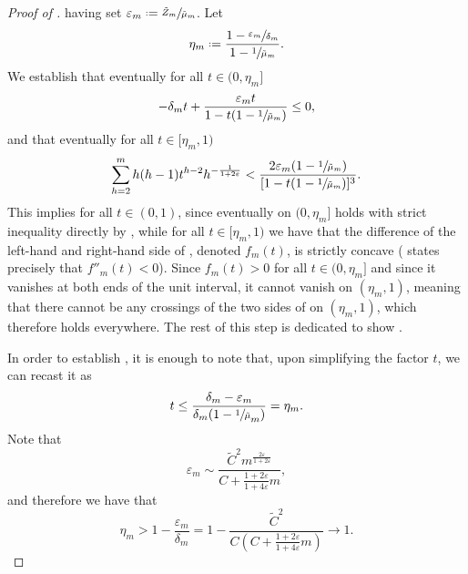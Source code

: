 \documentclass[11pt, a4paper, twoside]{article}
\newcommand*{\defeq}{\mathrel{\vcenter{\baselineskip0.5ex \lineskiplimit0pt
			\hbox{\scriptsize.}\hbox{\scriptsize.}}}=}
\newcommand{\eps}{\varepsilon}
\numberwithin{equation}{section}
\begin{document}
\begin{proof}[Proof of ]
		having set $\eps_m\defeq \sfrac{\tilde{Z}_m}{\tilde{\mu}_m}$. Let 
		\begin{align*}\label{eta}
			\eta_m\defeq \frac{1-\sfrac{\eps_m}{\delta_m}}{1-\sfrac{1}{\tilde{\mu}_m}}.
		\end{align*}
		We establish that eventually for all $t\in(0,\eta_m]$
		\begin{equation}\label{linear1}
			-\delta_mt+\frac{\eps_mt}{1-t(1-\sfrac{1}{\tilde{\mu}_m})}\le0,
		\end{equation}
		and that eventually for all $t\in[\eta_m,1)$
		\begin{equation}\label{concave1}
			\sum_{h=2}^m h(h-1)t^{h-2} h^{-\frac{1}{1+2\eps}}<\frac{2\eps_m(1-\sfrac{1}{\tilde{\mu}_m})}{[1-t(1-\sfrac{1}{\tilde{\mu}_m})]^3}.
		\end{equation}
		This implies  for all $t\in (0,1)$, since eventually on $(0,\eta_m]$  holds with strict inequality directly by , while for all $t\in[\eta_m,1)$ we have that the difference of the left-hand and right-hand side of , denoted $f_m(t)$, is strictly concave ( states precisely that $f''_m(t)<0$). Since $f_m(t)>0$ for all $t\in(0,\eta_m]$ and since it vanishes at both ends of the unit interval, it cannot vanish on $(\eta_m,1)$, meaning that there cannot be any crossings of the two sides of  on $(\eta_m,1)$, which therefore holds everywhere. The rest of this step is dedicated to show .
		
		In order to establish , it is enough to note that, upon simplifying the factor $t$, we can recast it as
		\begin{equation}\label{linear2}
			t\le\frac{\delta_m-\eps_m}{\delta_m(1-\sfrac{1}{\tilde{\mu}}_m)}=\eta_m.
		\end{equation}
		Note that
		\[\eps_m\sim \frac{\tilde{C}^2m^{\frac{2\eps}{1+2\eps}}}{C+\frac{1+2\eps}{1+4\eps}m},\]
		and therefore we have that
		\[
			\eta_m>1-\frac{\eps_m}{\delta_m}=1-\frac{\tilde{C}^2}{C\left(C+\frac{1+2\eps}{1+4\eps}m\right)}\longrightarrow 1.
		\]
		

\end{proof}
\end{document}
